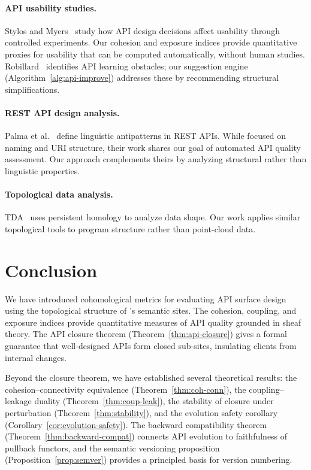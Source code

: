 \documentclass[11pt]{article}
\begin{document}
\paragraph{API usability studies.}
Stylos and Myers~\cite{Stylos2007} study how API design decisions affect
usability through controlled experiments.  Our cohesion and exposure
indices provide quantitative proxies for usability that can be computed
automatically, without human studies.  Robillard~\cite{Robillard2009}
identifies API learning obstacles; our suggestion engine
(Algorithm~\ref{alg:api-improve}) addresses these by recommending
structural simplifications.

\paragraph{REST API design analysis.}
Palma et al.~\cite{Palma2015} define linguistic antipatterns in REST APIs.
While focused on naming and URI structure, their work shares our goal of
automated API quality assessment.  Our approach complements theirs by
analyzing structural rather than linguistic properties.

\paragraph{Topological data analysis.}
TDA~\cite{Carlsson2009} uses persistent homology to analyze data shape.
Our work applies similar topological tools to program structure rather than
point-cloud data.

\section{Conclusion}\label{sec:conclusion}

We have introduced cohomological metrics for evaluating API surface design
using the topological structure of \JuGeo's semantic sites.  The cohesion,
coupling, and exposure indices provide quantitative measures of API quality
grounded in sheaf theory.  The API closure theorem
(Theorem~\ref{thm:api-closure}) gives a formal guarantee that
well-designed APIs form closed sub-sites, insulating clients from internal
changes.

Beyond the closure theorem, we have established several theoretical
results: the cohesion--connectivity equivalence
(Theorem~\ref{thm:coh-conn}), the coupling--leakage duality
(Theorem~\ref{thm:coup-leak}), the stability of closure under
perturbation (Theorem~\ref{thm:stability}), and the evolution safety
corollary (Corollary~\ref{cor:evolution-safety}).  The backward
compatibility theorem (Theorem~\ref{thm:backward-compat}) connects API
evolution to faithfulness of pullback functors, and the semantic
versioning proposition (Proposition~\ref{prop:semver}) provides a
principled basis for version numbering.
\end{document}
